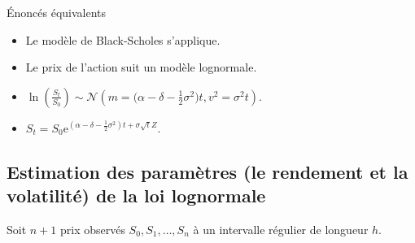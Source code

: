 \documentclass[10pt, french]{article}
\begin{document}
\begin{multicols*}{2}
\begin{conceptgen}{Énoncés équivalents}
\begin{itemize}[leftmargin = *]
	\item	Le modèle de Black-Scholes s'applique.
	\item	Le prix de l'action suit un modèle lognormale.
	\item	$\ln\left(\frac{S_{t}}{S_{0}}\right) \sim \mathcal{N}\left(m = \Big(\alpha - \delta - \frac{1}{2}\sigma^{2}\Big)t, v^{2} = \sigma^{2}t\right)$.
	\item	$S_{t} =	S_{0}\textrm{e}^{(\alpha - \delta - \frac{1}{2}\sigma^{2})t + \sigma\sqrt{t}Z}$.
\end{itemize}
\end{conceptgen}

\columnbreak
\subsection*{Estimation des paramètres (le rendement et la volatilité) de la loi lognormale}
Soit $n + 1$ prix observés $S_{0}, S_{1}, \dots, S_{n}$ à un intervalle régulier de longueur $h$.


\end{multicols*}
\end{document}
